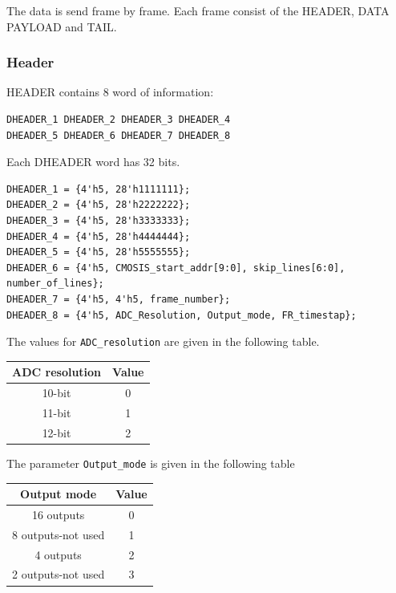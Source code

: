 The data is send frame by frame.
Each frame consist of the HEADER, DATA PAYLOAD and TAIL.


\subsubsection{Header}


HEADER contains 8 word of information:

\begin{verbatim}
DHEADER_1 DHEADER_2 DHEADER_3 DHEADER_4
DHEADER_5 DHEADER_6 DHEADER_7 DHEADER_8

\end{verbatim}
Each DHEADER word has 32 bits.
\begin{verbatim}
DHEADER_1 = {4'h5, 28'h1111111};
DHEADER_2 = {4'h5, 28'h2222222};
DHEADER_3 = {4'h5, 28'h3333333};
DHEADER_4 = {4'h5, 28'h4444444};
DHEADER_5 = {4'h5, 28'h5555555};
DHEADER_6 = {4'h5, CMOSIS_start_addr[9:0], skip_lines[6:0], number_of_lines};
DHEADER_7 = {4'h5, 4'h5, frame_number};
DHEADER_8 = {4'h5, ADC_Resolution, Output_mode, FR_timestap};
\end{verbatim}

The values for \verb/ADC_resolution/ are given in the following table.

\begin{tabular}{|c|c|}
\hline
ADC resolution				& Value 	\\	
\hline
10-bit				& 0 \\
\hline
11-bit				& 1 \\
\hline
12-bit				& 2 \\
\hline
\end{tabular}

The parameter \verb/Output_mode/ is given in the following table

\begin{tabular}{|c|c|}
\hline
Output mode			& Value 	\\	
\hline
16 outputs				& 0 \\
\hline
8 outputs-not used		& 1 \\
\hline
4 outputs				& 2 \\
\hline
2 outputs-not used		& 3 \\

\hline
\end{tabular}


